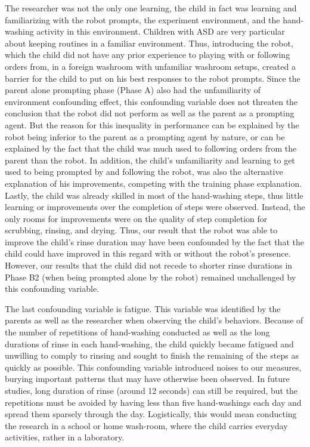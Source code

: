 \documentclass{ut-thesis}
\begin{document}
The researcher was not the only one learning, the child in fact was learning and familiarizing with the robot prompts, the experiment environment, and the hand-washing activity in this environment.  Children with ASD are very particular about keeping routines in a familiar environment.  Thus, introducing the robot, which the child did not have any prior experience to playing with or following orders from, in a foreign washroom with unfamiliar washroom setups, created a barrier for the child to put on his best responses to the robot prompts.  Since the parent alone prompting phase (Phase A) also had the unfamiliarity of environment confounding effect, this confounding variable does not threaten the conclusion that the robot did not perform as well as the parent as a prompting agent.  But the reason for this inequality in performance can be explained by the robot being inferior to the parent as a prompting agent by nature, or can be explained by the fact that the child was much used to following orders from the parent than the robot.  In addition, the child's unfamiliarity and learning to get used to being prompted by and following the robot, was also the alternative explanation of his improvements, competing with the training phase explanation.  Lastly, the child was already skilled in most of the hand-washing steps, thus little learning or improvements over the completion of steps were observed.  Instead, the only rooms for improvements were on the quality of step completion for scrubbing, rinsing, and drying.  Thus, our result that the robot was able to improve the child's rinse duration may have been confounded by the fact that the child could have improved in this regard with or without the robot's presence.  However, our results that the child did not recede to shorter rinse durations in Phase B2 (when being prompted alone by the robot) remained unchallenged by this confounding variable.

The last confounding variable is fatigue.  This variable was identified by the parents as well as the researcher when observing the child's behaviors.  Because of the number of repetitions of hand-washing conducted as well as the long durations of rinse in each hand-washing, the child quickly became fatigued and unwilling to comply to rinsing and sought to finish the remaining of the steps as quickly as possible.  This confounding variable introduced noises to our measures, burying important patterns that may have otherwise been observed.  In future studies, long duration of rinse (around 12 seconds) can still be required, but the repetitions must be avoided by having less than five hand-washings each day and spread them sparsely through the day.  Logistically, this would mean conducting the research in a school or home wash-room, where the child carries everyday activities, rather in a laboratory.
\end{document}
